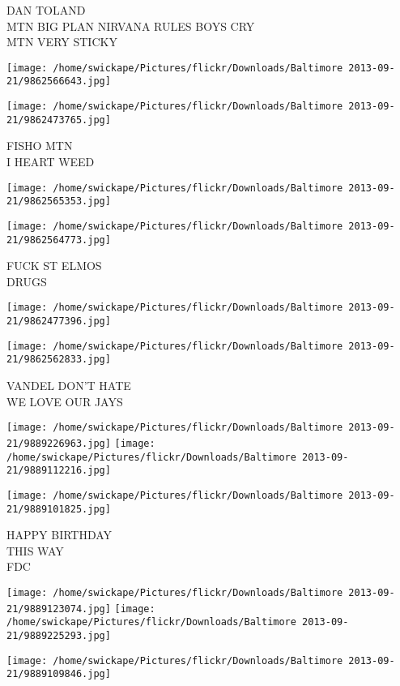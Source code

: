 \documentclass[10pt,letterpaper]{article}
\begin{document}
DAN TOLAND\\
MTN BIG PLAN NIRVANA RULES BOYS CRY\\
MTN VERY STICKY
\pagebreak

\texttt{[image: /home/swickape/Pictures/flickr/Downloads/Baltimore 2013-09-21/9862566643.jpg]}

\vspace{0.25in}
\texttt{[image: /home/swickape/Pictures/flickr/Downloads/Baltimore 2013-09-21/9862473765.jpg]}

FISHO MTN\\
I HEART WEED
\pagebreak

\texttt{[image: /home/swickape/Pictures/flickr/Downloads/Baltimore 2013-09-21/9862565353.jpg]}

\vspace{0.25in}
\texttt{[image: /home/swickape/Pictures/flickr/Downloads/Baltimore 2013-09-21/9862564773.jpg]}

FUCK ST ELMOS\\
DRUGS
\pagebreak

\texttt{[image: /home/swickape/Pictures/flickr/Downloads/Baltimore 2013-09-21/9862477396.jpg]}

\vspace{0.25in}
\texttt{[image: /home/swickape/Pictures/flickr/Downloads/Baltimore 2013-09-21/9862562833.jpg]}

VANDEL DON'T HATE\\
WE LOVE OUR JAYS
\pagebreak

\texttt{[image: /home/swickape/Pictures/flickr/Downloads/Baltimore 2013-09-21/9889226963.jpg]}
\texttt{[image: /home/swickape/Pictures/flickr/Downloads/Baltimore 2013-09-21/9889112216.jpg]}

\vspace{0.25in}
\texttt{[image: /home/swickape/Pictures/flickr/Downloads/Baltimore 2013-09-21/9889101825.jpg]}

HAPPY BIRTHDAY\\
THIS WAY\\
FDC
\pagebreak

\texttt{[image: /home/swickape/Pictures/flickr/Downloads/Baltimore 2013-09-21/9889123074.jpg]}
\texttt{[image: /home/swickape/Pictures/flickr/Downloads/Baltimore 2013-09-21/9889225293.jpg]}

\texttt{[image: /home/swickape/Pictures/flickr/Downloads/Baltimore 2013-09-21/9889109846.jpg]}
\end{document}
